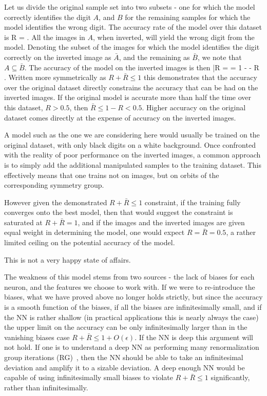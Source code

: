 \documentclass{svproc}
\begin{document}
Let us divide the original sample set into two subsets - one for which the model correctly identifies the digit $A$, and $B$ for the remaining samples for which the model identifies the wrong digit. The accuracy rate of the model over this dataset is 
\be
R = 
\; .
\ee
All the images in $A$, when inverted, will yield the wrong digit from the model. Denoting the subset of the images for which the model identifies the digit correctly on the inverted image as ${\bar A}$, and the remaining as ${\bar B}$, we note that $A \subseteq {\bar B}$. The accuracy of the model on the inverted images is then
\be
{\bar R} =  = 1 -   - R
\; .
\ee
Written more symmetrically as $R + {\bar R} \leq 1$ this demonstrates that the accuracy over the original dataset directly constrains the accuracy that can be had on the inverted images. If the original model is accurate more than half the time over this dataset, $R>0.5$, then ${\bar R} \leq 1 - R < 0.5$. Higher accuracy on the original dataset comes directly at the expense of accuracy on the inverted images.

A model such as the one we are considering here would usually be trained on the original dataset, with only black digits on a white background. Once confronted with the reality of poor performance on the inverted images, a common approach is to simply add the additional manipulated samples to the training dataset. This effectively means that one trains not on images, but on orbits of the corresponding symmetry group.

However given the demonstrated $R + {\bar R} \leq 1$ constraint, if the training fully converges onto the best model, then that would suggest 
the constraint is saturated at $R + {\bar R} = 1$, and if the images and the inverted images are given equal weight in determining the model, one would expect $R = {\bar R} = 0.5$, a rather limited ceiling on the potential accuracy of the model.

This is not a very happy state of affairs. 

The weakness of this model stems from two sources - the lack of biases for each neuron, and the features we choose to work with. If we were to re-introduce the biases, what we have proved above no longer holds strictly, but since the accuracy is a smooth function of the biases, if all the biases are infinitesimally small, and if the NN is rather shallow (in practical applications this is nearly always the case) the upper limit on the accuracy can be only infinitesimally larger than in the vanishing biases case $R + {\bar R} \leq 1 + O(\epsilon)$. If the NN is deep this argument will not hold. If one is to understand a deep NN as performing many renormalization group iterations (RG)~\cite{mehta2014exact}, then the NN should be able to take an infinitesimal deviation and amplify it to a sizable deviation. A deep enough NN would be capable of using infinitesimally small biases to violate $R + {\bar R} \leq 1$ significantly, rather than infinitesimally.
\end{document}
